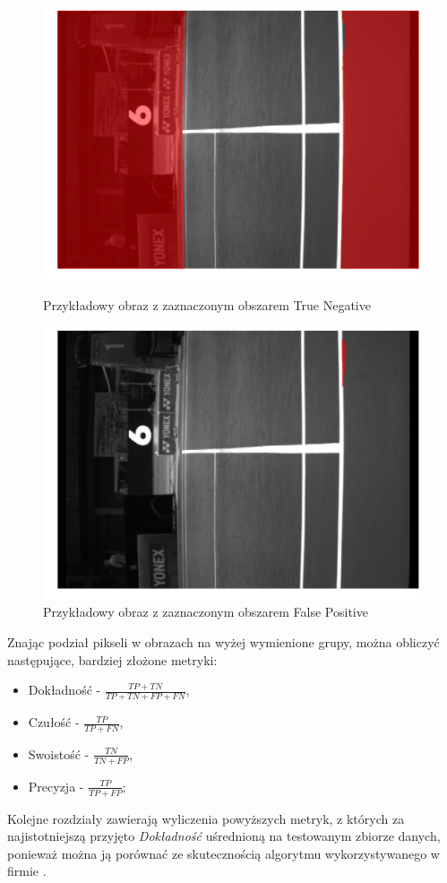 \begin{figure}[!htb]
    \includegraphics[width=\linewidth]{TN_frame_8.jpg}
    \caption{Przykładowy obraz z zaznaczonym obszarem True Negative}
    \label{fig:TN}
  \endminipage\hfill
    \includegraphics[width=\linewidth]{FP_frame_8.jpg}
    \caption{Przykładowy obraz z zaznaczonym obszarem False Positive}
    \label{fig:FP}
  \endminipage\hfill
\end{figure}

Znając podział pikseli w obrazach na wyżej wymienione grupy, można obliczyć następujące, bardziej złożone metryki:

\begin{itemize}
  \label{sec:miary}
  \item Dokładność - $ \frac{TP + TN}{TP + TN + FP + FN} $,
  \item Czułość - $ \frac{TP}{TP + FN} $,
  \item Swoistość - $ \frac{TN}{TN + FP} $,
  \item Precyzja - $ \frac{TP}{TP + FP} $;
\end{itemize}

Kolejne rozdziały zawierają wyliczenia powyższych metryk, z których za najistotniejszą przyjęto \textit{Dokładność} uśrednioną na testowanym zbiorze danych, ponieważ można ją porównać ze skutecznością algorytmu wykorzystywanego w firmie \blue{}.
